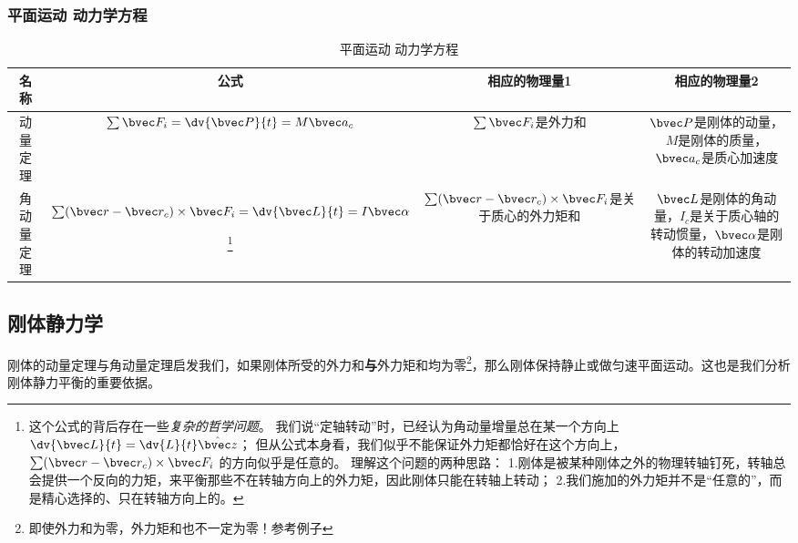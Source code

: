 \subsubsection{平面运动 动力学方程}
\begin{table}[ht]
\centering
\caption{平面运动 动力学方程}\label{RGAB_tab1}
\begin{tabular}{|c|c|c|c|}
\hline
名称 & 公式 & 相应的物理量1 & 相应的物理量2 \\
\hline
动量定理 & $\sum \bvec F_i = \dv{\bvec P}{t} = M \bvec a_c$ & $\sum \bvec F_i$是外力和 & $\bvec P$是刚体的动量，$M$是刚体的质量，$\bvec a_c$是质心加速度 \\
\hline
角动量定理 & $\sum (\bvec r - \bvec r_c) \times \bvec F_i = \dv{\bvec L}{t} = I \bvec \alpha$ 

\footnote{
这个公式的背后存在一些\textsl{复杂的哲学问题}。
我们说“定轴转动”时，已经认为角动量增量总在某一个方向上$\dv{\bvec L}{t} = \dv{L}{t} \hat{\bvec z}$；
但从公式本身看，我们似乎不能保证外力矩都恰好在这个方向上，$\sum (\bvec r - \bvec r_c) \times \bvec F_i$ 的方向似乎是任意的。
理解这个问题的两种思路：
1.刚体是被某种刚体之外的物理转轴钉死，转轴总会提供一个反向的力矩，来平衡那些不在转轴方向上的外力矩，因此刚体只能在转轴上转动；
2.我们施加的外力矩并不是“任意的”，而是精心选择的、只在转轴方向上的。
} 

& $\sum (\bvec r - \bvec r_c)\times \bvec F_i$是关于质心的外力矩和 & $\bvec L$是刚体的角动量，$I_c$是关于质心轴的转动惯量，$\bvec \alpha$是刚体的转动加速度 \\
\hline
\end{tabular}
\end{table}
\subsection{刚体静力学}
刚体的动量定理与角动量定理启发我们，如果刚体所受的外力和\textbf{与}外力矩和均为零\footnote{即使外力和为零，外力矩和也不一定为零！参考例子}，那么刚体保持静止或做匀速平面运动。这也是我们分析刚体静力平衡的重要依据。


